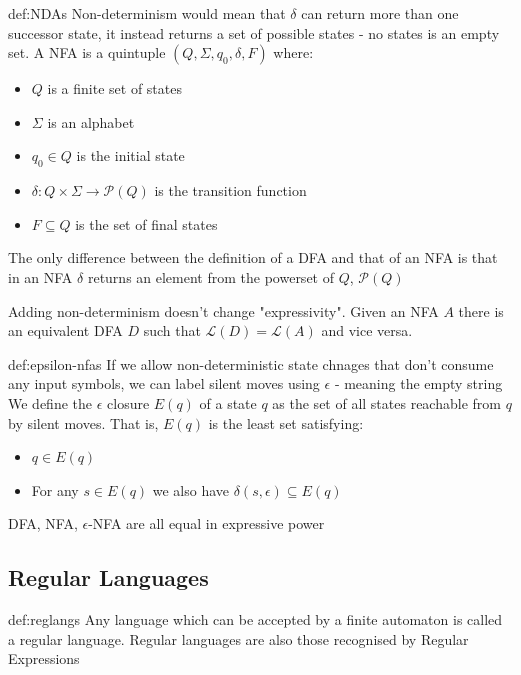 \documentclass[landscape, 8pt]{extarticle}
\begin{document}
\begin{multicols}{3}
\begin{dfn}{def:NDAs}{}
    Non-determinism would mean that $\delta$ can return more than one successor state, it instead returns a set of possible states - no states is an empty set. A NFA is a quintuple $(Q, \Sigma, q_0, \delta, F)$ where:
    \begin{itemize}
        \item $Q$ is a finite set of states
        \item $\Sigma$ is an alphabet
        \item $q_0 \in Q$ is the initial state
        \item $\delta : Q \times \Sigma \to \mathcal{P}(Q)$ is the transition function
        \item $F \subseteq Q$ is the set of final states
    \end{itemize}

    The only difference between the definition of a DFA and that of an NFA is that in an NFA $\delta$ returns an element from the powerset of $Q$, $\mathcal{P}(Q)$

    Adding non-determinism doesn't change "expressivity". Given an NFA $A$ there is an equivalent DFA $D$ such that $\mathcal{L}(D)=\mathcal{L}(A)$ and vice versa.

\end{dfn}

\begin{dfn}{def:epsilon-nfas}{}
If we allow non-deterministic state chnages that don't consume any input symbols, we can label silent moves using $\epsilon$ - meaning the empty string
We define the $\epsilon$ closure $E(q)$ of a state $q$ as the set of all states reachable from $q$ by silent moves. That is, $E(q)$ is the least set satisfying:
\renewcommand\labelitemi{\tiny$\bullet$}
\begin{itemize}
    \setlength\itemsep{0em}
    \item $q\in E(q)$
    \item For any $s\in E(q)$ we also have $\delta(s, \epsilon)\subseteq E(q)$
\end{itemize}
DFA, NFA, $\epsilon$-NFA are all equal in expressive power
\end{dfn}

\subsection*{Regular Languages}
\begin{dfn}{def:reglangs}{}
Any language which can be accepted by a finite automaton is called a regular language. \newline
Regular languages are also those recognised by Regular Expressions
\end{dfn}


\end{multicols}
\end{document}
